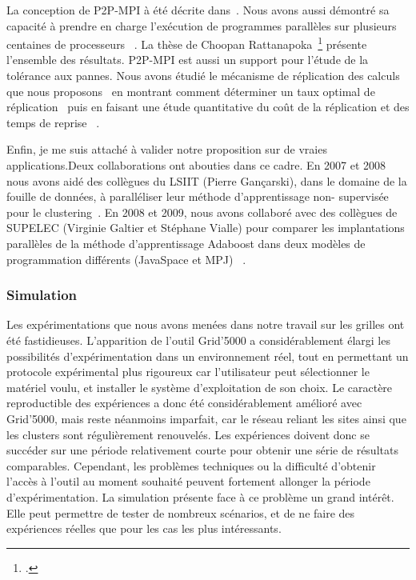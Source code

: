 \documentclass[11pt]{article}
\newcommand{\pmpi}{\mbox{\textsc{P2P-MPI}}}
\begin{document}
La conception de {\pmpi} à été décrite dans~\cite{icps-2007-182,icps-2005-155}.
Nous avons aussi démontré sa capacité à prendre en charge l'exécution de 
programmes parallèles sur plusieurs centaines de processeurs~%
\cite{icps-2008-193}. La thèse de Choopan Rattanapoka~\footcite{icps-2008-208} 
présente l'ensemble des résultats. {\pmpi} est aussi un support pour l'étude de 
la tolérance aux pannes. Nous avons étudié le mécanisme de réplication des 
calculs que nous proposons~\cite{icps-2007-185} en montrant comment déterminer 
un taux optimal de réplication~\cite{icps-2009-217} puis en faisant une étude 
quantitative du coût de la réplication et des temps de reprise~%
\cite{icps-2009-214}.

Enfin, je me suis attaché à valider notre proposition sur de vraies 
applications.Deux collaborations ont abouties dans ce cadre. En 2007 et 2008 
nous avons aidé des collègues du LSIIT (Pierre Gançarski), dans le domaine de 
la fouille de données, à paralléliser leur méthode d'apprentissage non-%
supervisée pour le clustering~\cite{icps-2008-188}. En 2008 et 2009, nous avons 
collaboré avec des collègues de SUPELEC (Virginie Galtier et Stéphane Vialle) 
pour comparer les implantations parallèles de la méthode d'apprentissage 
Adaboost dans deux modèles de programmation différents (JavaSpace et MPJ)~%
\cite{icps-2009-219}.


\subsubsection{Simulation}
\label{sc:simulation}

Les expérimentations que nous avons menées dans notre travail sur les grilles 
ont été fastidieuses. L'apparition de l'outil Grid'5000 a considérablement
élargi les possibilités d'expérimentation dans un environnement réel, tout
en permettant un protocole expérimental plus rigoureux car l'utilisateur
peut sélectionner le matériel voulu, et installer le système d'exploitation de
son choix. Le caractère reproductible des expériences a donc été considérablement
amélioré avec Grid'5000, mais reste néanmoins imparfait, car le
réseau reliant les sites ainsi que les clusters sont régulièrement renouvelés.
Les expériences doivent donc se succéder sur une période relativement courte
pour obtenir une série de résultats comparables. Cependant, les problèmes 
techniques ou la difficulté d'obtenir l'accès à l'outil au moment souhaité 
peuvent fortement allonger la période d'expérimentation.
La simulation présente face à ce problème un grand intérêt. Elle peut permettre
de tester de nombreux scénarios, et de ne faire des expériences réelles que pour
les cas les plus intéressants.\\
\end{document}
